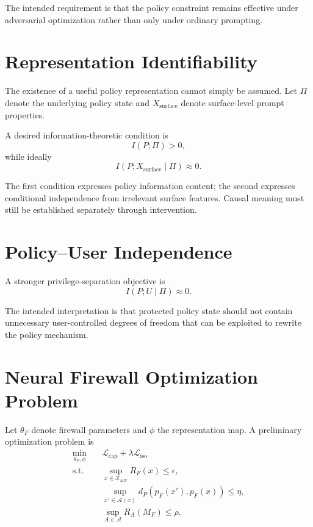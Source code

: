 \documentclass[11pt]{article}
\newcommand{\X}{\mathcal{X}}
\newcommand{\A}{\mathcal{A}}
\begin{document}
The intended requirement is that the policy constraint remains effective under
adversarial optimization rather than only under ordinary prompting.

\section{Representation Identifiability}

The existence of a useful policy representation cannot simply be assumed.
Let $\Pi$ denote the underlying policy state and
$X_{\mathrm{surface}}$ denote surface-level prompt properties.

A desired information-theoretic condition is
\begin{equation}
I(P;\Pi)>0,
\end{equation}
while ideally
\begin{equation}
I(P;X_{\mathrm{surface}}\mid\Pi)\approx0.
\end{equation}

The first condition expresses policy information content; the second
expresses conditional independence from irrelevant surface features.
Causal meaning must still be established separately through intervention.

\section{Policy--User Independence}

A stronger privilege-separation objective is
\begin{equation}
\boxed{
I(P;U\mid\Pi)\approx0.
}
\end{equation}

The intended interpretation is that protected policy state should not contain
unnecessary user-controlled degrees of freedom that can be exploited to
rewrite the policy mechanism.

\section{Neural Firewall Optimization Problem}

Let $\theta_F$ denote firewall parameters and $\phi$ the representation map.
A preliminary optimization problem is
\begin{equation}
\boxed{
\begin{aligned}
\min_{\theta_F,\phi}\quad&
\mathcal L_{\mathrm{cap}}
+\lambda\mathcal L_{\mathrm{iso}}
\\
\text{s.t.}\quad&
\sup_{x\in\X_{\mathrm{adv}}}R_F(x)\leq\epsilon,
\\
&
\sup_{x'\in\A(x)}
d_P\!\left(p_F(x'),p_F(x)\right)\leq\eta,
\\
&
\sup_{A\in\mathcal A}R_A(M_F)\leq\rho.
\end{aligned}
}
\end{equation}
\end{document}
